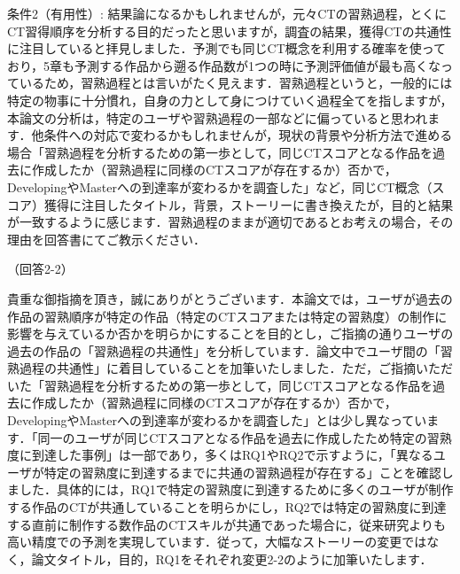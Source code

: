 \documentclass{jarticle} %
\def\subsection#1{ \vspace{1pc} {\gt #1} }
\begin{document}
条件2（有用性）: 
結果論になるかもしれませんが，元々CTの習熟過程，とくにCT習得順序を分析する目的だったと思いますが，調査の結果，獲得CTの共通性に注目していると拝見しました．予測でも同じCT概念を利用する確率を使っており，5章も予測する作品から遡る作品数が1つの時に予測評価値が最も高くなっているため，習熟過程とは言いがたく見えます．習熟過程というと，一般的には特定の物事に十分慣れ，自身の力として身につけていく過程全てを指しますが，本論文の分析は，特定のユーザや習熟過程の一部などに偏っていると思われます．他条件への対応で変わるかもしれませんが，現状の背景や分析方法で進める場合「習熟過程を分析するための第一歩として，同じCTスコアとなる作品を過去に作成したか（習熟過程に同様のCTスコアが存在するか）否かで，DevelopingやMasterへの到達率が変わるかを調査した」など，同じCT概念（スコア）獲得に注目したタイトル，背景，ストーリーに書き換えたが，目的と結果が一致するように感じます．習熟過程のままが適切であるとお考えの場合，その理由を回答書にてご教示ください．

\subsection{（回答2-2）}

貴重な御指摘を頂き，誠にありがとうございます．本論文では，ユーザが過去の作品の習熟順序が特定の作品（特定のCTスコアまたは特定の習熟度）の制作に影響を与えているか否かを明らかにすることを目的とし，ご指摘の通りユーザの過去の作品の「習熟過程の共通性」を分析しています．論文中でユーザ間の「習熟過程の共通性」に着目していることを加筆いたしました．ただ，ご指摘いただいた「習熟過程を分析するための第一歩として，同じCTスコアとなる作品を過去に作成したか（習熟過程に同様のCTスコアが存在するか）否かで，DevelopingやMasterへの到達率が変わるかを調査した」とは少し異なっています．「同一のユーザが同じCTスコアとなる作品を過去に作成したため特定の習熟度に到達した事例」は一部であり，多くはRQ1やRQ2で示すように，「異なるユーザが特定の習熟度に到達するまでに共通の習熟過程が存在する」ことを確認しました．具体的には，RQ1で特定の習熟度に到達するために多くのユーザが制作する作品のCTが共通していることを明らかにし，RQ2では特定の習熟度に到達する直前に制作する数作品のCTスキルが共通であった場合に，従来研究よりも高い精度での予測を実現しています．従って，大幅なストーリーの変更ではなく，論文タイトル，目的，RQ1をそれぞれ変更2-2のように加筆いたします．
\end{document}
